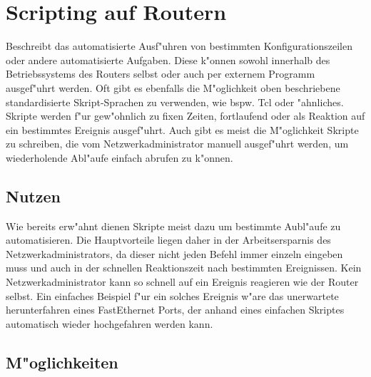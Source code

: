 \documentclass[a4paper,12pt]{scrreprt}
\begin{document}
\chapter{Scripting auf Routern}
Beschreibt das automatisierte Ausf"uhren von bestimmten Konfigurationszeilen oder andere automatisierte Aufgaben. Diese k"onnen sowohl innerhalb des Betriebssystems des Routers selbst oder auch per externem Programm ausgef"uhrt werden. Oft gibt es ebenfalls die M"oglichkeit oben beschriebene standardisierte Skript-Sprachen zu verwenden, wie bspw. Tcl oder "ahnliches. Skripte werden f"ur gew"ohnlich zu fixen Zeiten, fortlaufend oder als Reaktion auf ein bestimmtes Ereignis ausgef"uhrt. Auch gibt es meist die M"oglichkeit Skripte zu schreiben, die vom Netzwerkadministrator manuell ausgef"uhrt werden, um wiederholende Abl"aufe einfach abrufen zu k"onnen. 
\section{Nutzen}
Wie bereits erw"ahnt dienen Skripte meist dazu um bestimmte Aubl"aufe zu automatisieren. Die Hauptvorteile liegen daher in der Arbeitsersparnis des Netzwerkadministrators, da dieser nicht jeden Befehl immer einzeln eingeben muss und auch in der schnellen Reaktionszeit nach bestimmten Ereignissen. Kein Netzwerkadministrator kann so schnell auf ein Ereignis reagieren wie der Router selbst. Ein einfaches Beispiel f"ur ein solches Ereignis w"are das unerwartete herunterfahren eines FastEthernet Ports, der anhand eines einfachen Skriptes automatisch wieder hochgefahren werden kann. 
\section{M"oglichkeiten}
\end{document}
